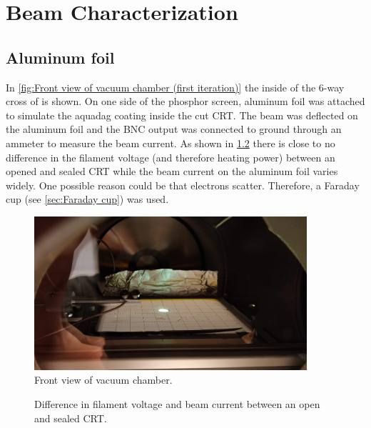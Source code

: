 
\chapter{Beam Characterization}
\label{ch:Beam Characterization}


\section{Aluminum foil}
\label{sec:Aluminum foil}

In \cref{fig:Front view of vacuum chamber (first iteration)} the inside of the 6-way cross of is shown. On one side of the phosphor screen, aluminum foil was attached to simulate the aquadag coating inside the cut CRT. The beam was deflected on the aluminum foil and the BNC output was connected to ground through an ammeter to measure the beam current. As shown in \cref{fig:Difference in filament voltage and beam current between an open and sealed CRT} there is close to no difference in the filament voltage (and therefore heating power) between an opened and sealed CRT while the beam current on the aluminum foil varies widely. One possible reason could be that electrons scatter. Therefore, a Faraday cup (see \cref{sec:Faraday cup}) was used.

\begin{figure}[h]
	\centering
	\includegraphics[width=0.9\textwidth]{./Chapters/beam-characterization/center_image}
	\caption{Front view of vacuum chamber.}
	\label{fig:Front view of vacuum chamber}
\end{figure}


\begin{figure}[ht]
	\centering
	
	\begin{tikzpicture}
		
	\end{tikzpicture}
	
	\caption{Difference in filament voltage and beam current between an open and sealed CRT.}
	\label{fig:Difference in filament voltage and beam current between an open and sealed CRT}
\end{figure}

